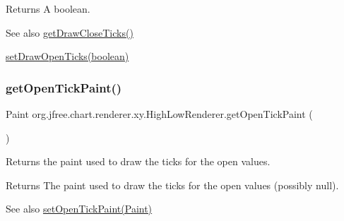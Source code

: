 \begin{DoxyReturn}{Returns}
A boolean.
\end{DoxyReturn}
\begin{DoxySeeAlso}{See also}
\mbox{\hyperlink{classorg_1_1jfree_1_1chart_1_1renderer_1_1xy_1_1_high_low_renderer_a5e9153dd2313078005e9eb7b6f5befae}{get\+Draw\+Close\+Ticks()}} 

\mbox{\hyperlink{classorg_1_1jfree_1_1chart_1_1renderer_1_1xy_1_1_high_low_renderer_aadd13238450e724e2fe9d8143fe105bc}{set\+Draw\+Open\+Ticks(boolean)}} 
\end{DoxySeeAlso}
\mbox{\label{classorg_1_1jfree_1_1chart_1_1renderer_1_1xy_1_1_high_low_renderer_aa1736c9fa4a2ca796213ac10998f7539}} 
\subsubsection{\texorpdfstring{get\+Open\+Tick\+Paint()}{getOpenTickPaint()}}
{\footnotesize\ttfamily Paint org.\+jfree.\+chart.\+renderer.\+xy.\+High\+Low\+Renderer.\+get\+Open\+Tick\+Paint (\begin{DoxyParamCaption}{ }\end{DoxyParamCaption})}

Returns the paint used to draw the ticks for the open values.

\begin{DoxyReturn}{Returns}
The paint used to draw the ticks for the open values (possibly {\ttfamily null}).
\end{DoxyReturn}
\begin{DoxySeeAlso}{See also}
\mbox{\hyperlink{classorg_1_1jfree_1_1chart_1_1renderer_1_1xy_1_1_high_low_renderer_a4655b4b71ecba1e39957fa0a578728c1}{set\+Open\+Tick\+Paint(\+Paint)}} 
\end{DoxySeeAlso}
\mbox{\label{classorg_1_1jfree_1_1chart_1_1renderer_1_1xy_1_1_high_low_renderer_a4ffbe156619ad52c131b2b946f109234}} 

